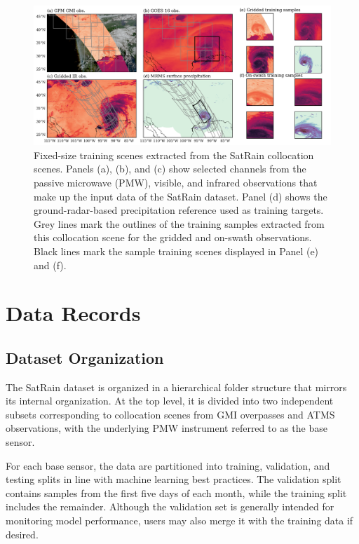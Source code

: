 \documentclass[11pt]{article}
\begin{document}
\begin{figure}[htbp] %
	\centering
	\includegraphics[width=1.0\textwidth]{figures/fig08}
	\caption{
		Fixed-size training scenes extracted from the SatRain collocation
		scenes. Panels (a), (b), and (c) show selected channels from the passive
		microwave (PMW), visible, and infrared observations that make up the
		input data of the SatRain dataset. Panel (d) shows the
		ground-radar-based precipitation reference used as training targets.
		Grey lines mark the outlines of the training samples extracted from this
		collocation scene for the gridded and on-swath observations. Black lines
		mark the sample training scenes displayed in Panel (e) and (f).
	}
	\label{fig:example_scenes}
\end{figure}


\section{Data Records}

\subsection{Dataset Organization}

The SatRain dataset is organized in a hierarchical folder structure that mirrors
its internal organization. At the top level, it is divided into two independent
subsets corresponding to collocation scenes from GMI overpasses and ATMS
observations, with the underlying PMW instrument referred to as the base sensor.

For each base sensor, the data are partitioned into training, validation, and
testing splits in line with machine learning best practices. The validation
split contains samples from the first five days of each month, while the
training split includes the remainder. Although the validation set is generally
intended for monitoring model performance, users may also merge it with the
training data if desired.
\end{document}
